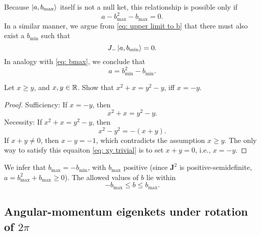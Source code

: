 \documentclass[10pt]{article}
\begin{document}
	Because $\ket{a, b_{\max}}$ itself is not a null ket, this relationship is possible only if
	\begin{equation}
		a - b_{\max}^2 - b_{\max} = 0.
	\end{equation}
	In a similar manner, we argue from \eqref{eq: upper limit to b} that there must also exist a $b_{\min}$ such that
	\begin{equation}
		J_- \ket{a, b_{\min}} = 0.
	\end{equation}
	In analogy with \eqref{eq: bmax}, we conclude that
	\begin{equation}
		a = b_{\min}^2 - b_{\min}.
	\end{equation}
	\begin{proposition}
		Let $x \ge y$, and $x, y \in {\mathbb{R}}$. Show that $x^2 + x = y^2 - y$, iff $x = -y$.
	\end{proposition}
	\begin{proof}
		Sufficiency: If $x = -y$, then
		\begin{equation}
			x^2 + x = y^2 - y.
		\end{equation}
		Necessity: If $x^2 + x = y^2 - y$, then
		\begin{equation}
			x^2 - y^2 = -(x + y). \label{eq: xy trivial}
		\end{equation}
		If $x+y \neq 0$, then $x - y = -1$, which contradicts the assumption $x \ge y$. The only way to satisfy this equaiton \eqref{eq: xy trivial} is to set $x + y = 0$, i.e., $x = -y$.
	\end{proof}
	We infer that $b_{\max} = -b_{\min}$, with $b_{\max}$ positive (since $\mathbf{J}^2$ is positive-semidefinite, $a = b_{\max}^2 + b_{\max} \ge 0$). The allowed values of $b$ lie within
	\begin{equation}
		-b_{\max} \le b \le b_{\max}.
	\end{equation}

	\subsection{Angular-momentum eigenkets under rotation of $2\pi$}
\end{document}
